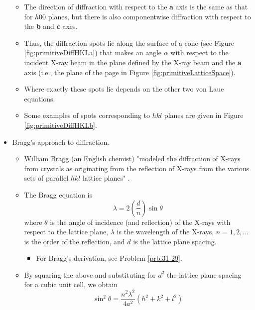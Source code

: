 \documentclass[../notes.tex]{subfiles}
\begin{document}
\begin{itemize}
\begin{figure}[h!]
        \label{fig:primitiveDiffHKL}
    \end{figure}
    \begin{itemize}
        \item The direction of diffraction with respect to the \textbf{a} axis is the same as that for $h00$ planes, but there is also componentwise diffraction with respect to the \textbf{b} and \textbf{c} axes.
        \item Thus, the diffraction spots lie along the surface of a cone (see Figure \ref{fig:primitiveDiffHKLa}) that makes an angle $\alpha$ with respect to the incident X-ray beam in the plane defined by the X-ray beam and the \textbf{a} axis (i.e., the plane of the page in Figure \ref{fig:primitiveLatticeSpace}).
        \item Where exactly these spots lie depends on the other two von Laue equations.
        \item Some examples of spots corresponding to $hkl$ planes are given in Figure \ref{fig:primitiveDiffHKLb}.
    \end{itemize}
    \item Bragg's approach to diffraction.
    \begin{itemize}
        \item William Bragg (an English chemist) "modeled the diffraction of X-rays from crystals as originating from the reflection of X-rays from the various sets of parallel $hkl$ lattice planes" \parencite[1286-87]{bib:McQuarrieSimon}.
        \item The Bragg equation is
        \begin{equation*}
            \lambda = 2\left( \frac{d}{n} \right)\sin\theta
        \end{equation*}
        where $\theta$ is the angle of incidence (and reflection) of the X-rays with respect to the lattice plane, $\lambda$ is the wavelength of the X-rays, $n=1,2,\dots$ is the order of the reflection, and $d$ is the lattice plane spacing.
        \begin{itemize}
            \item For Bragg's derivation, see Problem \ref{prb:31-29}.
        \end{itemize}
        \item By squaring the above and substituting for $d^2$ the lattice plane spacing for a cubic unit cell, we obtain
        \begin{equation*}
            \sin^2\theta = \frac{n^2\lambda^2}{4a^2}(h^2+k^2+l^2)
        \end{equation*}

\end{itemize}
\end{itemize}
\end{document}

